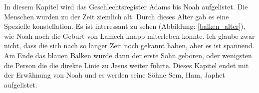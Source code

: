 In diesem Kapitel wird das Geschlechtsregister Adams bis Noah aufgelistet. Die Menschen wurden zu der Zeit ziemlich alt. Durch dieses Alter gab es eine Spezielle konstellation.
Es ist interessant zu sehen (Abbildung: \ref{balken_alter}), wie Noah noch die Geburt von Lamech knapp miterleben konnte. Ich glaube zwar nicht, dass die sich nach so langer Zeit noch gekannt haben, aber es ist spannend. Am Ende das blauen Balken wurde dann der erste Sohn geboren, oder wenigsten die Person die die direkte Linie zu Jesus weiter führte.
Dieses Kapitel endet mit der Erwähnung von Noah und es werden seine Söhne Sem, Ham, Japhet aufgelistet.